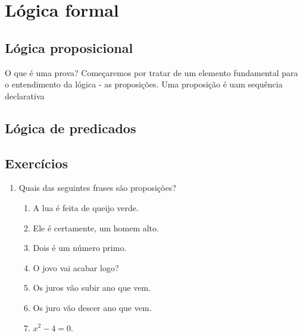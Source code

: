 \chapter{Lógica formal}
\label{cap:logicaformal}

\section{Lógica proposicional}
\label{sec:logicaproposicional}

O que é uma prova?
Começaremos por tratar de um elemento fundamental para o entendimento da lógica - as proposições. Uma proposição é
uam sequência declarativa


\section{Lógica de predicados}
\label{sec:logicadepredicados}


\section{Exercícios}
\label{sec:exercicios1}

\begin{enumerate}
  \item Quais das seguintes frases são proposições?
  \begin{enumerate}
  	\item A lua é feita de queijo verde.
  	\item Ele é certamente, um homem alto.
  	\item Dois é um número primo.
  	\item O jovo vai acabar logo?
  	\item Os juros vão subir ano que vem.
  	\item Os juro vão descer ano que vem.
  	\item $x^2 - 4 = 0.$
  \end{enumerate}
\end{enumerate}




